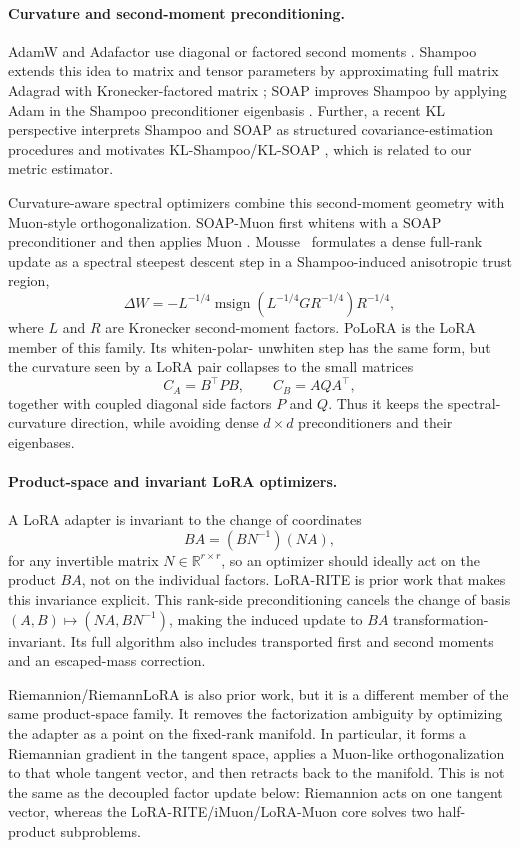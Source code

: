 \documentclass[11pt]{article}
\DeclareMathOperator{\polar}{msign}          %
\newcommand{\methodname}{PoLoRA\xspace}
\theoremstyle{plain}
\theoremstyle{definition}
\theoremstyle{remark}
\begin{document}
\paragraph{Curvature and second-moment preconditioning.}
AdamW and Adafactor use diagonal or factored second moments
\cite{adamw,adafactor}.  Shampoo extends this idea to matrix and tensor
parameters by approximating full matrix Adagrad with Kronecker-factored
matrix
\cite{shampoo}; SOAP improves Shampoo by applying Adam in the
Shampoo preconditioner eigenbasis \cite{soap}.  
Further, a recent KL perspective
interprets Shampoo and SOAP as structured covariance-estimation
procedures and motivates KL-Shampoo/KL-SOAP \cite{klshampoo}, which is
related to our metric estimator.

Curvature-aware spectral optimizers combine this second-moment geometry
with Muon-style orthogonalization.  SOAP-Muon first whitens with a SOAP
preconditioner and then applies Muon \cite{soapmuon}.  Mousse~ \cite{mousse} formulates
a dense full-rank update as a spectral steepest descent step in a
Shampoo-induced anisotropic trust region,
\[
    \Delta W
    =
    -L^{-1/4}
      \polar\left(L^{-1/4} G R^{-1/4}\right)
      R^{-1/4},
\]
where $L$ and $R$ are Kronecker second-moment factors.
\methodname{} is the LoRA member of this family.  Its whiten-polar-
unwhiten step has the same form, but the curvature seen by a LoRA pair
collapses to the small matrices
\[
    C_A=B^\top P B,\qquad C_B=AQA^\top ,
\]
together with coupled diagonal side factors $P$ and $Q$.  Thus it keeps the
spectral-curvature direction, while avoiding dense $d\times d$
preconditioners and their eigenbases.



\paragraph{Product-space and invariant LoRA optimizers.}
A LoRA adapter is invariant to the change of coordinates
\[
    BA=(BN^{-1})(NA),
\]
for any invertible matrix $N\in \mathbb{R}^{r\times r}$,
so an optimizer should ideally act on the product $BA$, not on the
individual factors.
LoRA-RITE \cite{lorarite} is prior work that
makes this invariance explicit.  
This rank-side preconditioning cancels the
change of basis $(A,B)\mapsto(NA,BN^{-1})$, making the induced update to
$BA$ transformation-invariant.
Its full
algorithm also includes transported first and second moments and an
escaped-mass correction.

Riemannion/RiemannLoRA \cite{riemannion} is also prior work, but it is a
different member of the same product-space family.  It removes the
factorization ambiguity by optimizing the adapter as a point on the
fixed-rank manifold.  In particular, it forms a Riemannian gradient in
the tangent space, applies a Muon-like orthogonalization to that whole
tangent vector, and then retracts back to the manifold.  This is not the
same as the decoupled factor update below: Riemannion acts on one
tangent vector, whereas the LoRA-RITE/iMuon/LoRA-Muon core solves two
half-product subproblems.
\end{document}
